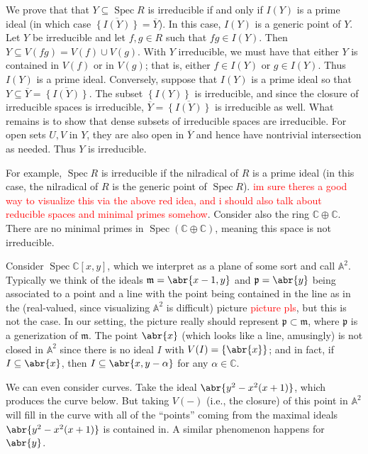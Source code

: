 \documentclass[11pt,leqno]{article}
\newcommand{\sai}[1]{\textcolor{red}{#1}}
\theoremstyle{plain}
\theoremstyle{definition}
\numberwithin{equation}{section}
\numberwithin{lem}{section}
\newcommand{\cbr}[1]{\left\{#1\right\}}
\DeclareMathOperator{\Spec}{Spec}
\begin{document}
We prove that that $Y\subseteq \Spec R$ is irreducible if and only if $I(Y)$ is a prime ideal (in which case $\overline{\cbr{I(Y)}} = \overline Y$). In this case, $I(Y)$ is a generic point of $Y$. 
Let $Y$ be irreducible and let $f,g\in R$ such that $fg\in I(Y)$. Then $Y\subseteq V(fg) = V(f)\cup V(g)$. With $Y$ irreducible, we must have that either $Y$ is contained in $V(f)$ or in $V(g)$; that is, either $f\in I(Y)$ or $g\in I(Y)$. Thus $I(Y)$ is a prime ideal. Conversely, suppose that $I(Y)$ is a prime ideal so that $Y\subseteq \overline Y = \overline{\cbr{I(Y)}}$. The subset $\cbr{I(Y)}$ is irreducible, and since the closure of irreducible spaces is irreducible, $\overline{Y}= \overline{\cbr{I(Y)}}$ is irreducible as well. What remains is to show that dense subsets of irreducible spaces are irreducible. For open sets $U,V$ in $Y$, they are also open in $\overline{Y}$ and hence have nontrivial intersection as needed. Thus $Y$ is irreducible.

For example, $\Spec R$ is irreducible if the nilradical of $R$ is a prime ideal (in this case, the nilradical of $R$ is the generic point of $\Spec R$). \sai{im sure theres a good way to visualize this via the above red idea, and i should also talk about reducible spaces and minimal primes somehow}. Consider also the ring $\mathbb C\oplus \mathbb C$. There are no minimal primes in $\Spec(\mathbb C\oplus \mathbb C)$, meaning this space is not irreducible.

Consider $\Spec \mathbb C[x,y]$, which we interpret as a plane of some sort and call $\mathbb A^2$. Typically we think of the ideals $\mathfrak m = \abr{x-1,y}$ and $\mathfrak p = \abr{y}$ being associated to a point and a line with the point being contained in the line as in the (real-valued, since visualizing $\mathbb A^2$ is difficult) picture \sai{picture pls}, but this is not the case. In our setting, the picture really should represent $\mathfrak p\subset \mathfrak m$, where $\mathfrak p$ is a generization of $\mathfrak m$. The point $\abr{x}$ (which looks like a line, amusingly) is not closed in $\mathbb A^2$ since there is no ideal $I$ with $V(I) = \cbr{\abr{x}}$; and in fact, if $I\subseteq \abr{x}$, then $I\subseteq \abr{x,y-\alpha}$ for any $\alpha\in \mathbb C$.

We can even consider curves. Take the ideal $\abr{y^2-x^2(x+1)}$, which produces the curve below. But taking $V(-)$ (i.e., the closure) of this point in $\mathbb A^2$ will fill in the curve with all of the ``points'' coming from the maximal ideals $\abr{y^2-x^2(x+1)}$ is contained in. A similar phenomenon happens for $\abr{y}$.
\end{document}

